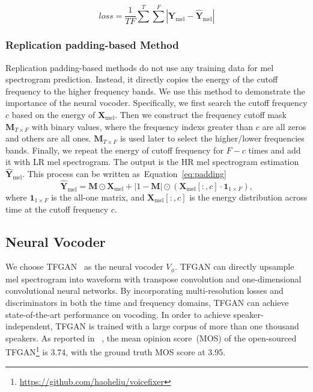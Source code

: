 \documentclass[a4paper]{article}
\def\Eqref#1{Equation~\ref{#1}}
\def\mM{{\mathbf{M}}}
\def\mX{{\mathbf{X}}}
\def\mY{{\mathbf{Y}}}
\begin{document}
\begin{equation}
  \label{eq:neural-network-based-loss}
  loss = \frac{1}{T F}\sum^{T}\sum^{F}|\mY_\text{mel}-\hat{\mY}_\text{mel}|
\end{equation}

\subsubsection{Replication padding-based Method}
\label{sec:statical-method}

Replication padding-based methods do not use any training data for mel spectrogram prediction. Instead, it directly copies the energy of the cutoff frequency to the higher frequency bands. We use this method to demonstrate the importance of the neural vocoder. 
Specifically, we first search the cutoff frequency $c$ based on the energy of $\mX_\text{mel}$. Then we construct the frequency cutoff mask $\mM_{T\times F}$ with binary values, where the frequency indexs greater than $c$ are all zeros and others are all ones. $\mM_{T\times F}$ is used later to select the higher/lower frequencies bands. 
Finally, we repeat the energy of cutoff frequency for $F-c$ times and add it with LR mel spectrogram. The output is the HR mel spectrogram estimation $\hat{\mY}_\text{mel}$. This process can be written as~\Eqref{eq:padding}
\begin{equation}
\label{eq:padding}
\hat{\mY}_\text{mel} = \mM \odot \mX_\text{mel} + |1-\mM| \odot  \left( \mX_\text{mel}[:,c] \cdot \textbf{1}_{1\times F} \right),
\end{equation}
where $\textbf{1}_{1\times F}$ is the all-one matrix, and $\mX_\text{mel}[:,c]$ is the energy distribution across time at the cutoff frequency $c$.



\subsection{Neural Vocoder}

We choose TFGAN~\cite{tian2020tfgan} as the neural vocoder $V_{\phi}$. TFGAN can directly upsample mel spectrogram into waveform with transpose convolution and one-dimensional convolutional neural networks. By incorporating multi-resolution losses and discriminators in both the time and frequency domains, TFGAN can achieve state-of-the-art performance on vocoding. In order to achieve speaker-independent, TFGAN is trained with a large corpus of more than one thousand speakers. As reported in ~\cite{liu2021voicefixer}, the mean opinion score~(MOS) of the open-sourced TFGAN\footnote{\url{https://github.com/haoheliu/voicefixer}} is \num{3.74}, with the ground truth MOS score at \num{3.95}.
\end{document}

